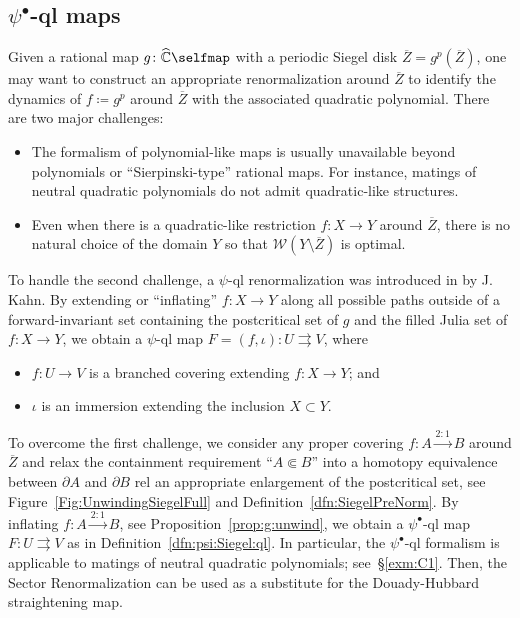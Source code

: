 \documentclass{amsart}
\newcommand{\1}{{\mathbb 1 }}
\newcommand{\Width}{{\mathcal W}}
\newcommand{\wC}{\widehat{\mathbb{C}}}
\theoremstyle{remark}
\numberwithin{equation}{section}
\theoremstyle{definition}
\begin{document}
\subsection{$\psi^\bullet$-ql maps}\label{ss:into:psi ql maps}
Given a rational map $g\colon \wC\selfmap$ with a periodic Siegel disk $\overline Z=g^p(\overline Z)$, one may want to construct an appropriate renormalization around $\overline Z$ to identify the dynamics of $f\coloneqq g^p$ around $\overline Z$ with the associated quadratic polynomial. There are two major challenges:
\begin{itemize}
  \item The formalism of polynomial-like maps is usually unavailable beyond polynomials or ``Sierpinski-type'' rational maps. For instance, matings of neutral quadratic polynomials do not admit quadratic-like structures. 
    \item Even when there is a quadratic-like restriction $f\colon X\to Y$ around $\overline Z$, there is no natural choice of the domain $Y$ so that $\Width(Y\setminus \overline Z)$ is optimal.
 \end{itemize}
To handle the second challenge, a $\psi$-ql renormalization was introduced in \cite{K} by J. Kahn. By extending or ``inflating'' $f\colon X\to Y$ along all possible paths outside of a forward-invariant set containing the postcritical set of $g$ and the filled Julia set of $f\colon X\to Y$, we obtain a $\psi$-ql map $F=(f,\iota)\colon U\rightrightarrows V$, where
\begin{itemize}
\item $f\colon U\to V$ is a branched covering extending $f\colon X\to Y$; and
\item  $\iota$ is an immersion extending the inclusion $X\subset Y$. 
\end{itemize}



To overcome the first challenge, we consider any proper covering $f\colon A\overset{2:1}{\longrightarrow} B$ around $\overline Z$ and relax the containment requirement ``$A\Subset B$'' into a homotopy equivalence between $\partial A$ and $\partial B$ rel an appropriate enlargement of the postcritical set, see Figure~\ref{Fig:UnwindingSiegelFull} and Definition~\ref{dfn:SiegelPreNorm}. By inflating $f\colon A\overset{2:1}{\longrightarrow} B$, see Proposition~\ref{prop:g:unwind}, we obtain a  $\psi^\bullet$-ql map $F\colon U \rightrightarrows V$ as in Definition~\ref{dfn:psi:Siegel:ql}. In particular, the $\psi^\bullet$-ql formalism is applicable to matings of neutral quadratic polynomials; see~\S\ref{exm:C1}. Then, the Sector Renormalization can be used as a substitute for the Douady-Hubbard straightening map.
\end{document}

